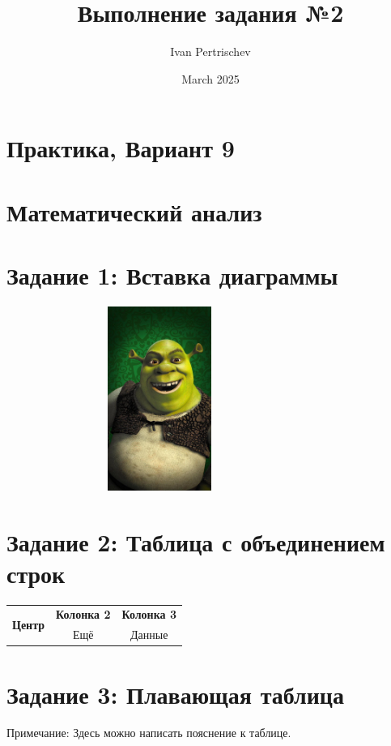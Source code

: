 \documentclass[a4paper, 11pt]{article}
\title{Выполнение задания №2}
\author{Ivan Pertrischev}
\date{March 2025}
\begin{document}
\maketitle

\section{Практика, Вариант 9}
\section{Математический анализ}

\section*{Задание 1: Вставка диаграммы}
\begin{center}
    \includegraphics[width=10cm,height=6cm,trim=0cm 2cm 0cm 0cm,clip,angle=12]{chart.jpg}
\end{center}

\section*{Задание 2: Таблица с объединением строк}
\begin{table}[h]
    \centering
    \begin{tabular}{ccc}
        \hline
        \multirow{2}{*}{\textbf{Центр}} & \textbf{Колонка 2} & \textbf{Колонка 3} \\
        \cline{2-3}
        & Ещё & Данные \\
        \hline
    \end{tabular}
\end{table}

\section*{Задание 3: Плавающая таблица}
\begin{table}[b]
    \centering
    \vspace{5pt} 
    \footnotesize Примечание: Здесь можно написать пояснение к таблице.
\end{table}
\end{document}
